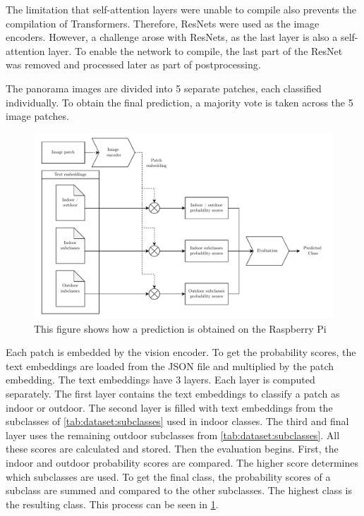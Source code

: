 The limitation that self-attention layers were unable to compile also prevents the compilation of Transformers.  
Therefore, ResNets were used as the image encoders.  
However, a challenge arose with ResNets, as the last layer is also a self-attention layer.  
To enable the network to compile, the last part of the ResNet was removed and processed later as part of postprocessing.  

The panorama images are divided into 5 separate patches, each classified individually.  
To obtain the final prediction, a majority vote is taken across the 5 image patches.

\begin{figure}[!h]
    \centering
    \includegraphics[width=\textwidth]{Images/SystemOverview/Evalution.pdf}
    \caption{This figure shows how a prediction is obtained on the Raspberry Pi}
    \label{fig:overview:evaluation}
\end{figure}

Each patch is embedded by the vision encoder.
To get the probability scores, the text embeddings are loaded from the JSON file and multiplied by the patch embedding.
The text embeddings have 3 layers.
Each layer is computed separately.
The first layer contains the text embeddings to classify a patch as indoor or outdoor.
The second layer is filled with text embeddings from the subclasses of \cref{tab:dataset:subclasses} used in indoor classes.
The third and final layer uses the remaining outdoor subclasses from \cref{tab:dataset:subclasses}.
All these scores are calculated and stored.
Then the evaluation begins.
First, the indoor and outdoor probability scores are compared.
The higher score determines which subclasses are used.
To get the final class, the probability scores of a subclass are summed and compared to the other subclasses.
The highest class is the resulting class.
This process can be seen in \cref{fig:overview:evaluation}.

